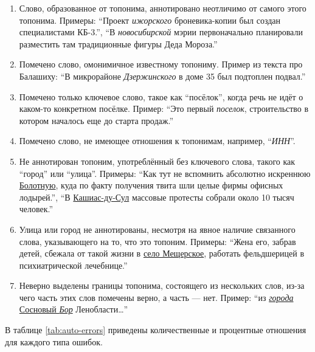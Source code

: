 \documentclass[14pt,russian]{extreport}
\begin{document}
\begin{enumerate}
  \item \label{izhorsky} Слово, образованное от топонима, аннотировано
    неотличимо от самого этого топонима. Примеры: ``Проект {\it ижорского}
    броневика-копии был создан специалистами КБ-3.'', ``В {\it новосибирской}
    мэрии первоначально планировали разместить там традиционные фигуры Деда
    Мороза.''

  \item \label{dzerzh} Помечено слово, омонимичное известному топониму. Пример
    из текста про Балашиху: ``В микрорайоне {\it Дзержинского} в доме 35 был
    подтоплен подвал.''

  \item \label{poselok} Помечено только ключевое слово, такое как ``посёлок'',
    когда речь не идёт о каком-то конкретном посёлке. Пример: ``Это первый {\it
    поселок}, строительство в котором началось еще до старта продаж.''

  \item \label{inn} Помечено слово, не имеющее отношения к топонимам, например,
    ``{\it ИНН}''.

  \item \label{bolotnaya} Не аннотирован топоним, употреблённый без ключевого
    слова, такого как ``город'' или ``улица''. Примеры: ``Как тут не вспомнить
    абсолютно искреннюю \underline{Болотную}, куда по факту получения твита шли
    целые фирмы офисных лодырей.'', ``В \underline{Кашиас-ду-Сул} массовые
    протесты собрали около 10 тысяч человек.''

  \item \label{meschera} Улица или город не аннотированы, несмотря на явное
    наличие связанного слова, указывающего на то, что это топоним. Примеры:
    ``Жена его, забрав детей, сбежала от такой жизни в \underline{село
    Мещерское}, работать фельдшерицей в психиатрической лечебнице.''

  \item \label{sosnoviy} Неверно выделены границы топонима, состоящего из
    нескольких слов, из-за чего часть этих слов помечены верно, а часть — нет.
    Пример: `` из \underline{{\it города} Сосновый {\it Бор}}
    Ленобласти\dots''
\end{enumerate}

В таблице \ref{tab:auto-errors} приведены количественные и процентные отношения
для каждого типа ошибок.
\end{document}

